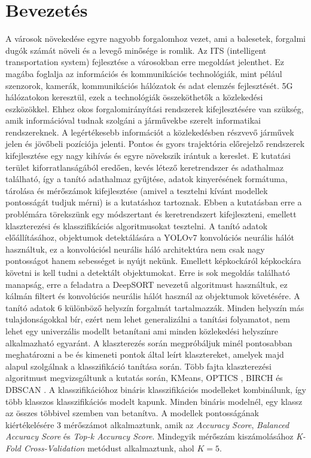 \documentclass[acmtog, authorversion]{acmart}
\begin{document}
\section{Bevezetés}
A városok növekedése egyre nagyobb forgalomhoz vezet, ami a balesetek, forgalmi dugók számát növeli és a levegő minősége is romlik.
Az ITS (intelligent transportation system) fejlesztése a városokban erre megoldást jelenthet. Ez magába foglalja az információs és
kommunikációs technológiák, mint pélául szenzorok, kamerák, kommunikációs hálózatok és adat elemzés fejlesztését. 5G hálózatokon
keresztül, ezek a technológiák összeköthetők a közlekedési eszközökkel. Ehhez okos forgalomirányítási rendszerek kifejlesztésére
van szükség, amik információval tudnak szolgáni a járművekbe szerelt informatikai rendszereknek.
A legértékesebb információt a közlekedésben részvevő járművek jelen és jövőbeli pozíciója jelenti. Pontos és gyors trajektória 
előrejelző rendszerek kifejlesztése egy nagy kihívás és egyre növekszik irántuk a kereslet. E kutatási terület kiforratlanságából
eredően, kevés létező keretrendszer és adathalmaz található, így a tanító adathalmaz gyűjtése, adatok kinyerésének formátuma, tárolása
és mérőszámok kifejlesztése (amivel a tesztelni kívánt modellek pontosságát tudjuk mérni) is a kutatáshoz tartoznak.  
Ebben a kutatásban erre a problémára törekszünk egy módszertant és keretrendszert kifejleszteni, emellett klaszterezési és klasszifikációs
algoritmusokat tesztelni. A tanító adatok előállításához, objektumok detektálására a YOLOv7 \cite{wang2022yolov7}
konvolúciós neurális hálót használtuk, ez a konvolúciósl neurális háló architektúra nem csak nagy pontosságot hanem sebességet is nyújt nekünk. 
Emellett képkockáról képkockára követni is kell tudni a detektált objektumokat. Erre is sok megoldás található manapság, erre a feladatra
a DeepSORT \cite{Wojke2018deep} nevezetű algoritmust használtuk, ez kálmán filtert és konvolúciós neurális hálót használ az objektumok követésére.
A tanító adatok 6 különböző helyszín forgalmát tartalmazzák. Minden helyszín más tulajdonságokkal bír, ezért nem lehet generalizálni
a tanítási folyamatot, nem lehet egy univerzális modellt betanítani ami minden közlekedési helyszínre alkalmazható egyaránt. A klaszterezés
során megpróbáljuk minél pontosabban meghatározni a be és kimeneti pontok által leírt klasztereket, amelyek majd alapul szolgálnak a
klasszifikáció tanítása során. Több fajta klaszterezési algoritmust megvizsgáltunk a kutatás során, KMeans, OPTICS \cite{10.1145/304181.304187}, BIRCH \cite{10.1145/233269.233324} és DBSCAN \cite{10.5555/3001460.3001507}\cite{10.1145/3068335}. 
A klasszifikációhoz bináris klasszifikációs modelleket kombinálunk, így több klasszos klasszifikációs modelt
kapunk. Minden bináris modelnél, egy klassz az összes többivel szemben van betanítva. A modellek pontosságának kiértékelésére 3 mérőszámot
alkalmaztunk, amik az \emph{Accuracy Score}, \emph{Balanced Accuracy Score} \cite{10.1109/ICPR.2010.764} és \emph{Top-k Accuracy Score}.
Mindegyik mérőszám kiszámolásához \emph{K-Fold Cross-Validation} \cite{Anguita2012TheI} metódust alkalmaztunk, ahol \begin{math}K=5\end{math}.
\end{document}
